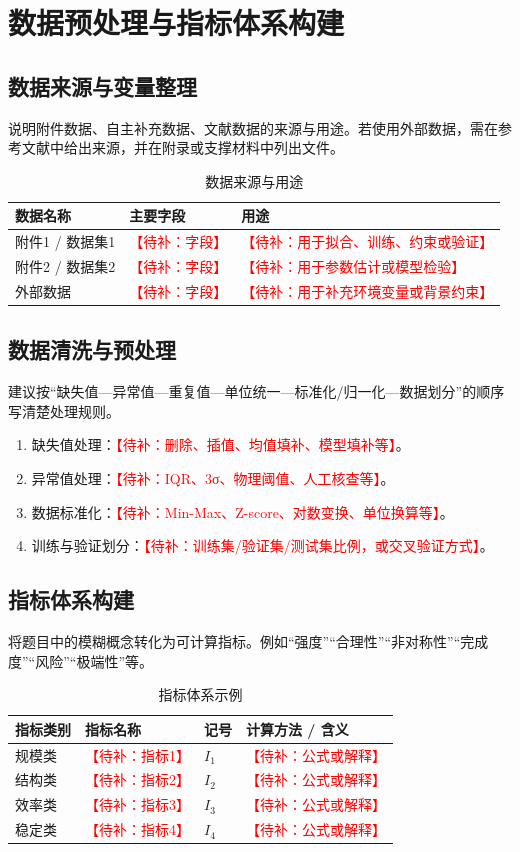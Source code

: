 \documentclass[UTF8,a4paper,zihao=5]{ctexart}
\numberwithin{equation}{section}
\numberwithin{figure}{section}
\numberwithin{table}{section}
\newcommand{\todo}[1]{\textcolor{red}{【待补：#1】}}
\begin{document}
\section{数据预处理与指标体系构建}

\subsection{数据来源与变量整理}
说明附件数据、自主补充数据、文献数据的来源与用途。若使用外部数据，需在参考文献中给出来源，并在附录或支撑材料中列出文件。

\begin{table}[H]
  \centering
  \caption{数据来源与用途}
  \begin{tabularx}{\linewidth}{lXX}
    \toprule
    数据名称 & 主要字段 & 用途 \\
    \midrule
    附件1 / 数据集1 & \todo{字段} & \todo{用于拟合、训练、约束或验证} \\
    附件2 / 数据集2 & \todo{字段} & \todo{用于参数估计或模型检验} \\
    外部数据 & \todo{字段} & \todo{用于补充环境变量或背景约束} \\
    \bottomrule
  \end{tabularx}
\end{table}

\subsection{数据清洗与预处理}
建议按“缺失值—异常值—重复值—单位统一—标准化/归一化—数据划分”的顺序写清楚处理规则。
\begin{enumerate}
  \item 缺失值处理：\todo{删除、插值、均值填补、模型填补等}。
  \item 异常值处理：\todo{IQR、3σ、物理阈值、人工核查等}。
  \item 数据标准化：\todo{Min-Max、Z-score、对数变换、单位换算等}。
  \item 训练与验证划分：\todo{训练集/验证集/测试集比例，或交叉验证方式}。
\end{enumerate}

\subsection{指标体系构建}
将题目中的模糊概念转化为可计算指标。例如“强度”“合理性”“非对称性”“完成度”“风险”“极端性”等。
\begin{table}[H]
  \centering
  \caption{指标体系示例}
  \begin{tabularx}{\linewidth}{lXlX}
    \toprule
    指标类别 & 指标名称 & 记号 & 计算方法 / 含义 \\
    \midrule
    规模类 & \todo{指标1} & $I_1$ & \todo{公式或解释} \\
    结构类 & \todo{指标2} & $I_2$ & \todo{公式或解释} \\
    效率类 & \todo{指标3} & $I_3$ & \todo{公式或解释} \\
    稳定类 & \todo{指标4} & $I_4$ & \todo{公式或解释} \\
    \bottomrule
  \end{tabularx}
\end{table}
\end{document}
